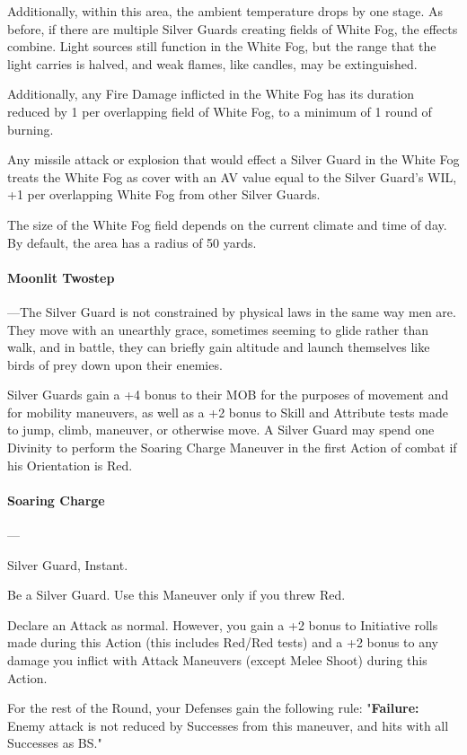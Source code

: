 \documentclass[oneside,11pt,english]{book}
\begin{document}
Additionally, within this area, the ambient temperature drops by 
one stage. As before, if there are multiple Silver Guards creating fields of White Fog, the effects 
combine. Light sources still function in the White Fog, but the range that the light carries is  halved, and weak flames, like candles, may be extinguished. 

Additionally, any Fire Damage inflicted in the White Fog has its duration reduced by 1 per 
overlapping field of White Fog, to a minimum of 1 round of burning. 

Any missile attack or explosion that would effect a Silver Guard in the White Fog treats the White Fog as cover with an AV value equal to the Silver Guard's WIL, +1 per overlapping White Fog from other Silver Guards. 


The size of the White Fog field depends on the current climate and time of day. By default, the area has a radius of 50 yards.
\paragraph{Moonlit Twostep}
---\quad The Silver Guard is not constrained by physical laws in the same way men are. They move with 
an unearthly grace, sometimes seeming to glide rather than walk, and in battle, they can briefly 
gain altitude and launch themselves like birds of prey down upon their enemies. 


Silver Guards gain a +4 bonus to their MOB for the purposes of movement and for mobility 
maneuvers, as well as a +2 bonus to Skill and Attribute tests made to jump, climb, maneuver, or 
otherwise move. A Silver Guard may spend one Divinity to perform the Soaring Charge 
Maneuver in the first Action of combat if his Orientation is Red. 


\paragraph{\label{man:Soaring Charge}Soaring Charge}---
\begin{description}
  [itemsep=0.5mm]
\item [Special:] Silver Guard, Instant. 
\item [Requirements:] Be a Silver Guard. Use this Maneuver only if you threw Red. 
\item [Maneuver:] Declare an Attack as normal. However, you gain a +2 bonus to Initiative rolls made during this Action (this includes Red/Red tests) and a +2 bonus to any damage you inflict with Attack Maneuvers (except Melee Shoot) during this Action.
\item [Special:] For the rest of the Round, your Defenses gain the following rule: "\textbf{Failure:} Enemy attack is not reduced by Successes from this maneuver, and hits with all Successes as BS."
\end{description}
\end{document}
